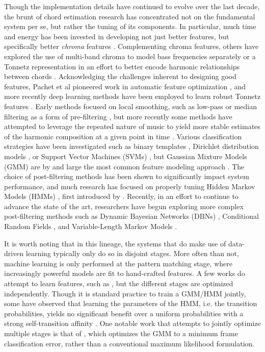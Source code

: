 Though the implementation details have continued to evolve over the last decade, the brunt of chord estimation research has concentrated not on the fundamental system per se, but rather the tuning of its components.
In particular, much time and energy has been invested in developing not just better features, but specifically better \emph{chroma} features \cite{Mueller2010Towards}.
Complementing chroma features, others have explored the use of multi-band chroma to model bass frequencies separately \cite{Mauch2010Simultaneous} or a Tonnetz representation in an effort to better encode harmonic relationships between chords \cite{Lee2007Unified}.
Acknowledging the challenges inherent to designing good features, Pachet et al pioneered work in automatic feature optimization \cite{Pachet2006Recognizing}, and more recently deep learning methods have been employed to learn robust Tonnetz features \cite{Humphrey2012Learning}.
Early methods focused on local smoothing, such as low-pass or median filtering as a form of pre-filtering \cite{Cho2010Exploring}, but more recently some methods have attempted to leverage the repeated nature of music to yield more stable estimates of the harmonic composition at a given point in time \cite{Cho2011Feature}.
Various classification strategies have been investigated such as binary templates \cite{Oudre2009Template}, Dirichlet distribution models \cite{Burgoyne2005Learning}, or Support Vector Machines (SVMs) \cite{Weller2009Structured}, but Gaussian Mixture Models (GMM) are by and large the most common feature modeling approach \cite{Cho2014Improved}.
The choice of post-filtering methods has been shown to significantly impact system performance, and much research has focused on properly tuning Hidden Markov Models (HMMs) \cite{Cho2010Exploring}, first introduced by \cite{Sheh2003Chord}.
Recently, in an effort to continue to advance the state of the art, researchers have begun exploring more complex post-filtering methods such as Dynamic Bayesian Networks (DBNs) \cite{Mauch2010Approximate}, Conditional Random Fields \cite{Sumi2012Music}, and Variable-Length Markov Models \cite{Chordia2011Predictive}.

It is worth noting that in this lineage, the systems that do make use of data-driven learning typically only do so in disjoint stages.
More often than not, machine learning is only performed at the pattern matching stage, where increasingly powerful models are fit to hand-crafted features.
A few works do attempt to learn features, such as \cite{Mauch2010Approximate, Humphrey2012Learning}, but the different stages are optimized independently.
Though it is standard practice to train a GMM/HMM jointly, some have observed that learning the parameters of the HMM, i.e. the transition probabilities, yields no significant benefit over a uniform probabilities with a strong self-transition affinity \cite{Cho2014Improved}.
One notable work that attempts to jointly optimize multiple stages is that of \cite{Cho2012Minimum}, which optimizes the GMM to a minimum frame classification error, rather than a conventional maximum likelihood formulation.


